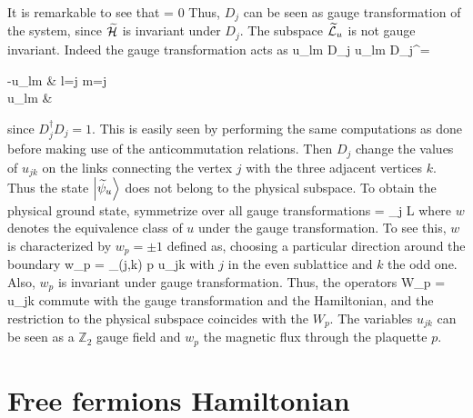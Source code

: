 		It is remarkable to see that
		\be [\widetilde{\mc H}, D_j]= 0 \ee
		Thus, $D_j$ can be seen as gauge transformation of the system, since $\widetilde{\mathcal H}$ is invariant under $D_j$. The subspace $\widetilde{\mathcal L}_u$ is not gauge invariant. Indeed the gauge transformation acts as
		\be u_{lm} \to D_j u_{lm} D_j^\dagger = \begin{cases} -u_{lm} &  l=j  m=j \\ u_{lm} &  \end{cases} \ee
		since $D_j^\dagger D_j = 1$. This is easily seen by performing the same computations as done before making use of the anticommutation relations. Then $D_j$ change the values of $u_{jk}$ on the links connecting the vertex $j$ with the three adjacent vertices $k$. Thus the state $\ket{\widetilde{\psi}_u}$ does not belong to the physical subspace. To obtain the physical ground state, symmetrize over all gauge transformations
		\be {} = \prod_j   \in \mc L \ee
		where $w$ denotes the equivalence class of $u$ under the gauge transformation. To see this, $w$ is characterized by $w_p = \pm 1$ defined as, choosing a particular direction around the boundary
		\be w_p = \prod_{(j,k) \in \partial p} u_{jk} \ee
		with $j$ in the even sublattice and $k$ the odd one. Also, $w_p$ is invariant under gauge transformation. Thus, the operators
		\be \widetilde W_p = \prod \hat u_{jk} \ee
		commute with the gauge transformation and the Hamiltonian, and the restriction to the physical subspace coincides with the $W_p$. The variables $u_{jk}$ can be seen as a $\mathbb Z_2$ gauge field and $w_p$ the magnetic flux through the plaquette $p$.

	\section{Free fermions Hamiltonian}

